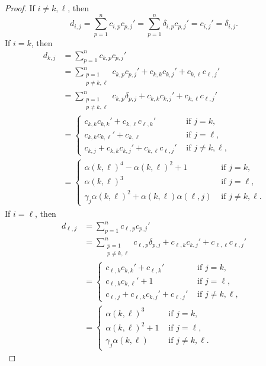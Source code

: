 \documentclass[10pt,a4paper]{amsart}
\begin{document}
\begin{proof}
If $i\neq k, \ell$, then 
$$    d_{i,j} =\sum_{p=1}^{n} c_{i,p}c_{p,j}'   =\sum_{p=1}^{n} \delta_{i,p}c_{p,j}' =c_{i,j}' = \delta_{i,j}.$$ 
If $i=k$, then 
$$
\begin{aligned}
  d_{k,j}  &=\sum_{p=1}^{n} c_{k,p}c_{p,j}' \\
      &=\sum_{\substack{p=1\\p\neq k,\ell}}^{n}c_{k,p}c_{p,j}' + c_{k,k}c_{k,j}' + c_{k,\ell}c_{\ell,j}'\\
      &=\sum_{\substack{p=1\\p\neq k,\ell}}^{n}c_{k,p}\delta_{p,j} + c_{k,k}c_{k,j}' + c_{k,\ell}c_{\ell,j}'\\
      &=\begin{cases}
          c_{k,k}c_{k,k}' + c_{k,\ell}c_{\ell,k}' &\text { if } j=k,\\
          c_{k,k}c_{k,\ell}' + c_{k,\ell} &\text { if } j=\ell, \\
          c_{k,j}+c_{k,k}c_{k,j}'+c_{k,\ell}c_{\ell,j}' &\text { if } j\neq k, \ell,
      \end{cases} \\
      &=\begin{cases}
           \alpha(k,\ell)^4-\alpha(k,\ell)^2+1 & \text{ if } j=k,\\
      \alpha(k,\ell)^3 & \text{ if }  j=\ell,\\
	\gamma_j\alpha(k,\ell)^2+\alpha(k,\ell)\alpha(\ell,j)  & \text{ if }  j\neq k ,\ell.
\end{cases}
\end{aligned}
$$
If $i=\ell$, then 
$$
\begin{aligned}
  d_{\ell,j}  &=\sum_{p=1}^{n} c_{\ell,p}c_{p,j}' \\
      &=\sum_{\substack{p=1\\p\neq k,\ell}}^{n}c_{\ell,p}\delta_{p,j} + c_{\ell,k}c_{k,j}' + c_{\ell,\ell}c_{\ell,j}'\\
      &=\begin{cases}
         c_{\ell,k}c_{k,k}' + c_{\ell,k}'  &\text { if } j=k,\\
	c_{\ell,k}c_{k,\ell}'+ 1  &\text { if } j=\ell, \\
         c_{\ell,j} + c_{\ell,k}c_{k,j}' +c_{\ell,j}' &\text { if } j\neq k, \ell,
      \end{cases} \\
      &=\begin{cases}
        \alpha(k,\ell)^3  &\text { if } j=k,\\
		\alpha(k,\ell)^2 + 1  &\text { if } j=\ell, \\
		\gamma_j\alpha(k,\ell)	 &\text { if } j\neq k, \ell.
      \end{cases}
      \end{aligned}
$$
\end{proof}
\end{document}
